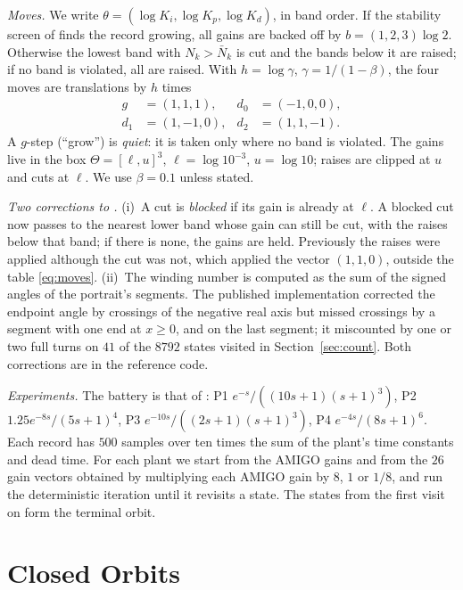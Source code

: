 \documentclass[letterpaper, 10 pt, conference]{ieeeconf}
\newcommand{\Nbar}{\bar{N}}
\begin{document}
\emph{Moves.} We write $\theta = (\log K_i, \log K_p, \log K_d)$, in band order.
If the stability screen of \cite{Paper1} finds the record growing, all gains
are backed off by $b = (1, 2, 3) \log 2$. Otherwise the lowest band with
$N_k > \Nbar_k$ is cut and the bands below it are raised; if no band is
violated, all are raised. With $h = \log\gamma$, $\gamma = 1/(1-\beta)$, the four
moves are translations by $h$ times
\begin{equation}
\begin{aligned}
g &= (1, 1, 1), & d_0 &= (-1, 0, 0),\\
d_1 &= (1, -1, 0), & d_2 &= (1, 1, -1).
\end{aligned}
\label{eq:moves}
\end{equation}
A $g$-step (``grow'') is \emph{quiet}: it is taken only where no band is
violated. The gains live in the box $\Theta = [\ell, u]^3$,
$\ell = \log 10^{-3}$, $u = \log 10$; raises are clipped at $u$ and cuts at
$\ell$. We use $\beta = 0.1$ unless stated.

\emph{Two corrections to \cite{Paper1}.} (i)~A cut is \emph{blocked} if its
gain is already at $\ell$. A blocked cut now passes to the nearest lower band
whose gain can still be cut, with the raises below that band; if there is
none, the gains are held. Previously the raises were applied although the
cut was not, which applied the vector $(1, 1, 0)$, outside the table
\eqref{eq:moves}. (ii)~The winding number is computed as the sum of the
signed angles of the portrait's segments. The published implementation
corrected the endpoint angle by crossings of the negative real axis but
missed crossings by a segment with one end at $x \ge 0$, and on the last
segment; it miscounted by one or two full turns on $41$ of the $8792$ states
visited in Section~\ref{sec:count}. Both corrections are in the reference
code.

\emph{Experiments.} The battery is that of \cite{Paper1}: P1
$e^{-s}/((10s+1)(s+1)^3)$, P2 $1.25e^{-8s}/(5s+1)^4$, P3
$e^{-10s}/((2s+1)(s+1)^3)$, P4 $e^{-4s}/(8s+1)^6$. Each record has $500$
samples over ten times the sum of the plant's time constants and dead time.
For each plant we start from the AMIGO gains \cite{AstromHagglund2004} and
from the $26$ gain vectors obtained by multiplying each AMIGO gain by $8$,
$1$ or $1/8$, and run the deterministic iteration until it revisits a state.
The states from the first visit on form the terminal orbit.

\section{Closed Orbits}
\label{sec:orbits}
\end{document}
